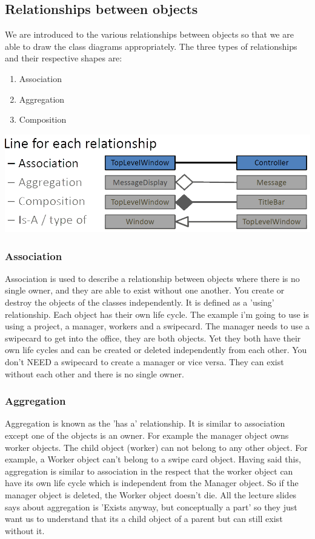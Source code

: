 \documentclass{article}
\begin{document}
\subsection{Relationships between objects}

We are introduced to the various relationships between objects so that we are able to draw the 
class diagrams appropriately. The three types of relationships and their respective shapes are:

\begin{enumerate}
\item Association
\item Aggregation
\item Composition
\end{enumerate}

\includegraphics[scale=0.3]{class.png}

\subsubsection{Association}
Association is used to describe a relationship between objects where there is no single owner, 
and they are able to exist without one another. You create or destroy the objects of the 
classes independently. It is defined as a 'using' relationship. Each object has their own 
life cycle. The example i'm going to use is using a project, a  manager, workers and a swipecard.
The manager needs to use a swipecard to get into the office, they are both objects. Yet they 
both have their own life cycles and can be created or deleted independently from each other.
You don't NEED a swipecard to create a manager or vice versa. They can exist without each other
and there is no single owner.



\subsubsection{Aggregation}
Aggregation is known as the 'has a' relationship. It is similar to association except one of the
objects is an owner. For example the manager object owns worker objects. The child object (worker)
can not belong to any other object. For example, a Worker object can't belong to a swipe card
object. Having said this, aggregation is similar to association in the respect that the worker 
object can have its own life cycle which is independent from the Manager object. So if the
manager object is deleted, the Worker object doesn't die.  All the lecture slides says about
aggregation is 'Exists anyway, but conceptually a part' so they just want us to understand 
that its a child object of a parent but can still exist without it.
\end{document}

